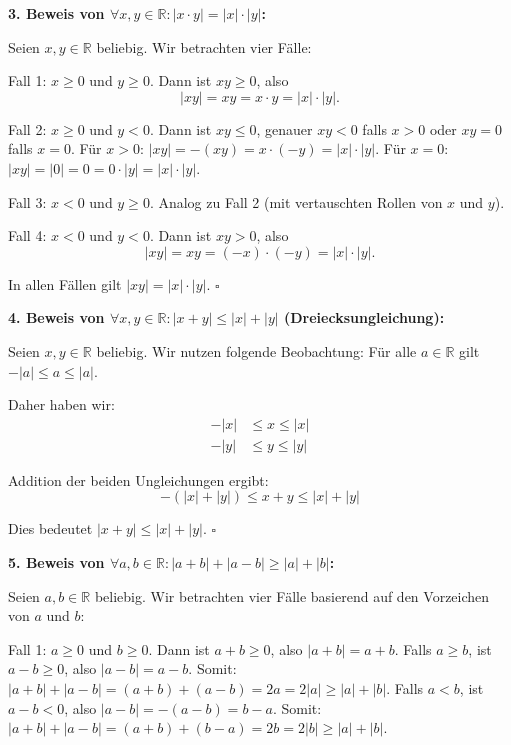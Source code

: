 \documentclass{article}
\newcommand{\abs}[1]{|#1|}
\newcommand{\R}{\mathbb{R}}
\newcommand{\fa}[1]{\forall #1 \colon}
\begin{document}
\textbf{3. Beweis von \(\fa{x, y \in \R} \abs{x \cdot y} = \abs{x} \cdot \abs{y}\):}

Seien $x, y \in \R$ beliebig. Wir betrachten vier Fälle:

Fall 1: $x \geq 0$ und $y \geq 0$. Dann ist $xy \geq 0$, also
\[\abs{xy} = xy = x \cdot y = \abs{x} \cdot \abs{y}.\]

Fall 2: $x \geq 0$ und $y < 0$. Dann ist $xy \leq 0$, genauer $xy < 0$ falls $x > 0$ oder $xy = 0$ falls $x = 0$.
Für $x > 0$: $\abs{xy} = -(xy) = x \cdot (-y) = \abs{x} \cdot \abs{y}$.
Für $x = 0$: $\abs{xy} = \abs{0} = 0 = 0 \cdot \abs{y} = \abs{x} \cdot \abs{y}$.

Fall 3: $x < 0$ und $y \geq 0$. Analog zu Fall 2 (mit vertauschten Rollen von $x$ und $y$).

Fall 4: $x < 0$ und $y < 0$. Dann ist $xy > 0$, also
\[\abs{xy} = xy = (-x) \cdot (-y) = \abs{x} \cdot \abs{y}.\]

In allen Fällen gilt $\abs{xy} = \abs{x} \cdot \abs{y}$. $\square$

\textbf{4. Beweis von \(\fa{x, y \in \R} \abs{x + y} \leq \abs{x} + \abs{y}\) (Dreiecksungleichung):}

Seien $x, y \in \R$ beliebig. Wir nutzen folgende Beobachtung:
Für alle $a \in \R$ gilt $-\abs{a} \leq a \leq \abs{a}$.

Daher haben wir:
\begin{align}
-\abs{x} &\leq x \leq \abs{x} \\
-\abs{y} &\leq y \leq \abs{y}
\end{align}

Addition der beiden Ungleichungen ergibt:
\[-(\abs{x} + \abs{y}) \leq x + y \leq \abs{x} + \abs{y}\]

Dies bedeutet $\abs{x + y} \leq \abs{x} + \abs{y}$. $\square$

\textbf{5. Beweis von \(\fa{a,b \in \R} \abs{a + b} + \abs{a - b} \geq \abs{a} + \abs{b}\):}

Seien $a, b \in \R$ beliebig. Wir betrachten vier Fälle basierend auf den Vorzeichen von $a$ und $b$:

Fall 1: $a \geq 0$ und $b \geq 0$. 
Dann ist $a + b \geq 0$, also $\abs{a + b} = a + b$.
Falls $a \geq b$, ist $a - b \geq 0$, also $\abs{a - b} = a - b$.
Somit: $\abs{a + b} + \abs{a - b} = (a + b) + (a - b) = 2a = 2\abs{a} \geq \abs{a} + \abs{b}$.
Falls $a < b$, ist $a - b < 0$, also $\abs{a - b} = -(a - b) = b - a$.
Somit: $\abs{a + b} + \abs{a - b} = (a + b) + (b - a) = 2b = 2\abs{b} \geq \abs{a} + \abs{b}$.
\end{document}
